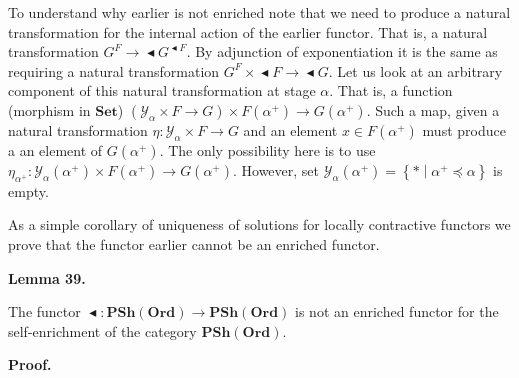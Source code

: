  
 
To understand why earlier is not enriched note that we need to produce a natural transformation for the internal action of the earlier functor. That is, a natural transformation $G^{F}\to\mathop{\blacktriangleleft}G^{\mathop{\blacktriangleleft}F}$. By adjunction of exponentiation it is the same as requiring a natural transformation $G^{F}\times{\mathop{\blacktriangleleft}F}\to\mathop{\blacktriangleleft}G$. Let us look at an arbitrary component of this natural transformation at stage $\alpha$. That is, a function (morphism in $\mathbf{Set}$) $(\mathcal{Y}_{\alpha}\times F\to G)\times F({\alpha}^{+})\to G({\alpha}^{+})$. Such a map, given a natural transformation $\eta:\mathcal{Y}_{\alpha}\times F\to G$ and an element $x\in F({\alpha}^{+})$ must produce a an element of $G({\alpha}^{+})$. The only possibility here is to use $\eta_{{\alpha}^{+}}:\mathcal{Y}_{\alpha}({\alpha}^{+})\times F({\alpha}^{+})\to G({\alpha}^{+})$. However, set $\mathcal{Y}_{\alpha}({\alpha}^{+})=\left\{*\middle|{\alpha}^{+}\preceq\alpha\right\}$ is empty.\par
 
 
 
 
As a simple corollary of uniqueness of solutions for locally contractive functors we prove that the functor earlier cannot be an enriched functor.\par
 
 
 
\par\medskip\noindent\textbf{Lemma 39.}\par
 
 
The functor $\mathop{\blacktriangleleft}:\mathbf{PSh}(\mathbf{Ord})\to\mathbf{PSh}(\mathbf{Ord})$ is not an enriched functor for the self-enrichment of the category $\mathbf{PSh}(\mathbf{Ord})$.\par
 
 
 
 
\par\medskip\noindent\textbf{Proof.}\par
 
